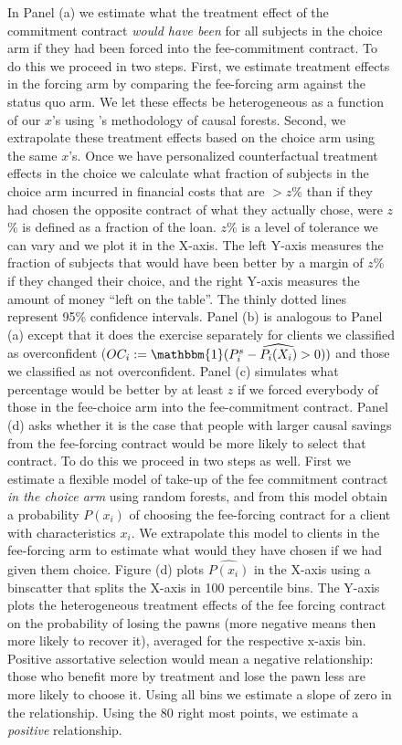 \documentclass[11pt]{article}
\begin{document}
\begin{figure}[H]
\begin{center}
    \end{center}
        \scriptsize
        In Panel (a) we estimate what the treatment effect of the commitment contract \textit{would have been} for all subjects in the choice arm if they had been forced into the fee-commitment contract. To do this we proceed in two steps. First, we estimate treatment effects in the forcing arm by comparing the fee-forcing arm against the status quo arm. We let these effects be heterogeneous as a function of our $x$'s using \cite{atheygrf}'s methodology of causal forests. Second, we extrapolate these treatment effects based on the choice arm using the same $x$'s. Once we have personalized counterfactual treatment effects in the choice we calculate what fraction of subjects in the choice arm incurred in financial costs that are  $> z$\% than if they had chosen the opposite contract of what they actually chose, were $z$\% is defined as a fraction of the loan. $z$\% is a level of tolerance we can vary and we plot it in the X-axis. The left Y-axis measures the fraction of subjects that would have been better by a margin of $z$\% if they changed their choice, and the right Y-axis measures the amount of money ``left on the table''. The thinly dotted lines represent 95\% confidence intervals.  Panel (b) is analogous to Panel (a) except that it does the exercise separately for clients we classified as overconfident ($OC_i:=\mathbbm{1}(P^s_i-\widehat{P_i(X_i)}>0))$ and those we classified as not overconfident. Panel (c) simulates what percentage would be better by at least $z$ if we forced everybody of those in the fee-choice arm into the fee-commitment contract. Panel (d) asks whether it is the case that people with larger causal savings from the fee-forcing contract would be more likely to select that contract. To do this we proceed in two steps as well. First we estimate a flexible model of take-up of the fee commitment contract \textit{in the choice arm} using random forests, and from this model obtain a probability $P(x_i)$ of choosing the fee-forcing contract for a client with characteristics $x_i$. We extrapolate this model to clients in the fee-forcing arm to estimate what would they have chosen if we had given them choice. Figure (d) plots $\widehat{P(x_i)}$ in the X-axis using a binscatter that splits the X-axis in 100 percentile bins. The Y-axis plots the heterogeneous treatment effects of the fee forcing contract on the probability of losing the pawns (more negative means then more likely to recover it), averaged for the respective x-axis bin. Positive assortative selection would mean a negative relationship: those who benefit more by treatment and lose the pawn less are more likely to choose it.  Using all bins we estimate a slope of zero in the relationship. Using the 80 right most points, we estimate a \textit{positive} relationship.
\end{figure}
\end{document}
